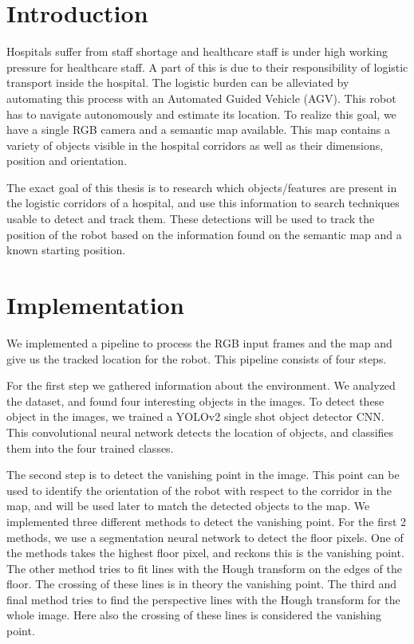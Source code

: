 \section*{Introduction}
Hospitals suffer from staff shortage and healthcare staff is under high working pressure for healthcare staff.
A part of this is due to their responsibility of logistic transport inside the hospital.
The logistic burden can be alleviated by automating this process with an Automated Guided Vehicle (AGV).
This robot has to navigate autonomously and estimate its location.
To realize this goal, we have a single RGB camera and a semantic map available.
This map contains a variety of objects visible in the hospital corridors as well as their dimensions, position and orientation.

The exact goal of this thesis is to research which objects/features are present in the logistic corridors of a hospital, and use this
information to search techniques usable to detect and track them.
These detections will be used to track the position of the robot based on the information found on the semantic map and a known starting position.


\section*{Implementation}
We implemented a pipeline to process the RGB input frames and the map and give us the tracked location for the robot.
This pipeline consists of four steps.

For the first step we gathered information about the environment.
We analyzed the dataset, and found four interesting objects in the images.
To detect these object in the images, we trained a YOLOv2 single shot object detector CNN.
This convolutional neural network detects the location of objects, and classifies them into the four trained classes.

The second step is to detect the vanishing point in the image.
This point can be used to identify the orientation of the robot with respect to the corridor in the map, and will be used later to match the detected objects to the map.
We implemented three different methods to detect the vanishing point.
For the first 2 methods, we use a segmentation neural network to detect the floor pixels.
One of the methods takes the highest floor pixel, and reckons this is the vanishing point.
The other method tries to fit lines with the Hough transform on the edges of the floor.
The crossing of these lines is in theory the vanishing point.
The third and final method tries to find the perspective lines with the Hough transform for the whole image.
Here also the crossing of these lines is considered the vanishing point.

